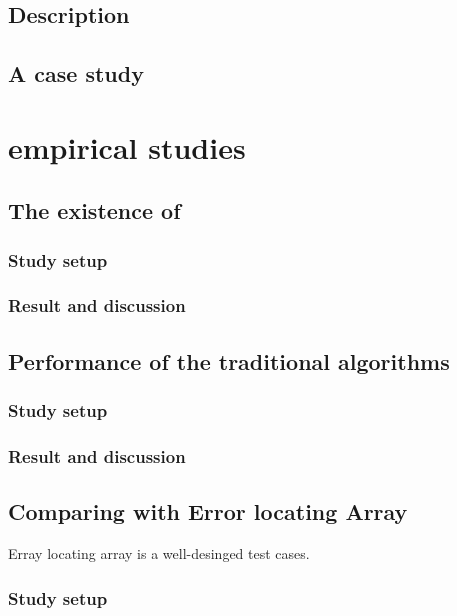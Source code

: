 \documentclass{sig-alternate}
\begin{document}
\subsection{Description}


\subsection{A case study}

\section{empirical studies}


\subsection{The existence of }


\subsubsection{Study setup}


\subsubsection{Result and discussion}


\subsection{Performance of the traditional algorithms}

\subsubsection{Study setup}

\subsubsection{Result and discussion}


\subsection{Comparing with Error locating Array}
Erray locating array is a well-desinged test cases.


\subsubsection{Study setup}
\end{document}
